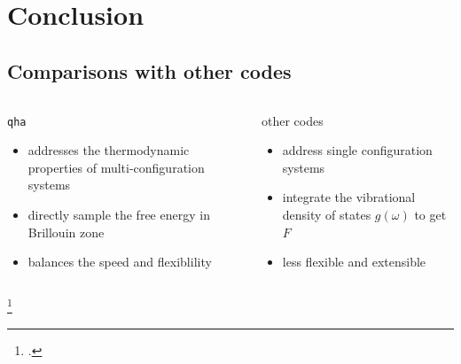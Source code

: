 \documentclass[13pt,aspectratio=169]{beamer}
\begin{document}
\section{Conclusion}

\subsection{Comparisons with other codes}
\begin{frame}{\subsecname}
	\begin{columns}
		\begin{column}{0.45\textwidth}
			\texttt{qha}\\
			\begin{itemize}[<+(1)->]
				\item addresses the thermodynamic properties of multi-configuration systems
				\item directly sample the free energy in Brillouin zone
				\item balances the speed and flexiblility
			\end{itemize}
		\end{column}

		\begin{column}{0.45\textwidth}
			other codes\\
			\begin{itemize}
				\item address single configuration systems
				\item integrate the vibrational density of states $g(\omega)$ to get $F$\footnotemark
				\item less flexible and extensible\footnotemark
			\end{itemize}
		\end{column}
	\end{columns}
	\setcounter{footnote}{5}
	\footcitetext{Petretto:2018gg}
\end{frame}
\end{document}
